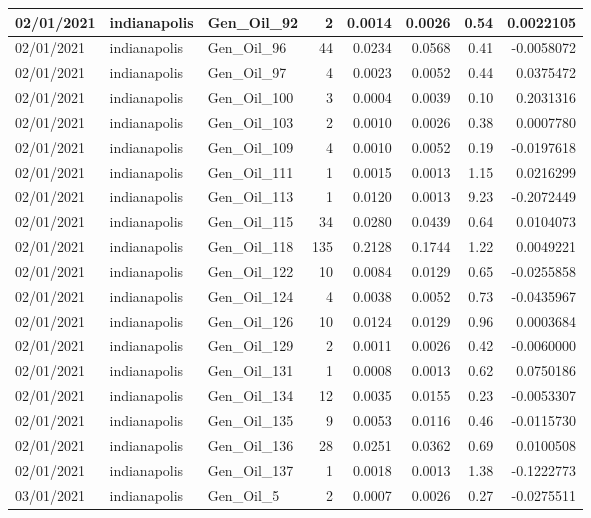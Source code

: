\documentclass[
  letterpaper,
  DIV=11,
  numbers=noendperiod]{scrartcl}
\begin{document}
\begin{tabular}{l|l|l|r|r|r|r|r}
\hline
02/01/2021 & indianapolis & Gen\_Oil\_92 & 2 & 0.0014 & 0.0026 & 0.54 & 0.0022105\\
\hline
02/01/2021 & indianapolis & Gen\_Oil\_96 & 44 & 0.0234 & 0.0568 & 0.41 & -0.0058072\\
\hline
02/01/2021 & indianapolis & Gen\_Oil\_97 & 4 & 0.0023 & 0.0052 & 0.44 & 0.0375472\\
\hline
02/01/2021 & indianapolis & Gen\_Oil\_100 & 3 & 0.0004 & 0.0039 & 0.10 & 0.2031316\\
\hline
02/01/2021 & indianapolis & Gen\_Oil\_103 & 2 & 0.0010 & 0.0026 & 0.38 & 0.0007780\\
\hline
02/01/2021 & indianapolis & Gen\_Oil\_109 & 4 & 0.0010 & 0.0052 & 0.19 & -0.0197618\\
\hline
02/01/2021 & indianapolis & Gen\_Oil\_111 & 1 & 0.0015 & 0.0013 & 1.15 & 0.0216299\\
\hline
02/01/2021 & indianapolis & Gen\_Oil\_113 & 1 & 0.0120 & 0.0013 & 9.23 & -0.2072449\\
\hline
02/01/2021 & indianapolis & Gen\_Oil\_115 & 34 & 0.0280 & 0.0439 & 0.64 & 0.0104073\\
\hline
02/01/2021 & indianapolis & Gen\_Oil\_118 & 135 & 0.2128 & 0.1744 & 1.22 & 0.0049221\\
\hline
02/01/2021 & indianapolis & Gen\_Oil\_122 & 10 & 0.0084 & 0.0129 & 0.65 & -0.0255858\\
\hline
02/01/2021 & indianapolis & Gen\_Oil\_124 & 4 & 0.0038 & 0.0052 & 0.73 & -0.0435967\\
\hline
02/01/2021 & indianapolis & Gen\_Oil\_126 & 10 & 0.0124 & 0.0129 & 0.96 & 0.0003684\\
\hline
02/01/2021 & indianapolis & Gen\_Oil\_129 & 2 & 0.0011 & 0.0026 & 0.42 & -0.0060000\\
\hline
02/01/2021 & indianapolis & Gen\_Oil\_131 & 1 & 0.0008 & 0.0013 & 0.62 & 0.0750186\\
\hline
02/01/2021 & indianapolis & Gen\_Oil\_134 & 12 & 0.0035 & 0.0155 & 0.23 & -0.0053307\\
\hline
02/01/2021 & indianapolis & Gen\_Oil\_135 & 9 & 0.0053 & 0.0116 & 0.46 & -0.0115730\\
\hline
02/01/2021 & indianapolis & Gen\_Oil\_136 & 28 & 0.0251 & 0.0362 & 0.69 & 0.0100508\\
\hline
02/01/2021 & indianapolis & Gen\_Oil\_137 & 1 & 0.0018 & 0.0013 & 1.38 & -0.1222773\\
\hline
03/01/2021 & indianapolis & Gen\_Oil\_5 & 2 & 0.0007 & 0.0026 & 0.27 & -0.0275511\\

\end{tabular}
\end{document}
